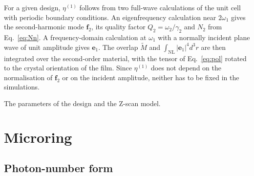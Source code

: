 \documentclass[9pt]{osa-supplemental-document}
\newcommand{\f}{\mathbf f}
\newcommand{\NL}{\mathrm{NL}}
\begin{document}
For a given design, $\eta^{(1)}$ follows from two full-wave calculations
of the unit cell with periodic boundary conditions.  An eigenfrequency
calculation near $2\omega_1$ gives the second-harmonic mode $\f_2$, its
quality factor $Q_2=\omega_2/\gamma_2$ and $N_2$ from Eq.~\eqref{eq:Nn}.  A
frequency-domain calculation at $\omega_1$ with a normally incident plane
wave of unit amplitude gives $\mathbf e_1$.  The overlap $\widetilde M$
and $\int_{\NL}|\mathbf e_1|^4d^3r$ are then integrated over the
second-order material, with the tensor of Eq.~\eqref{eq:pol} rotated to the
crystal orientation of the film.  Since $\eta^{(1)}$ does not depend on the
normalisation of $\f_2$ or on the incident amplitude, neither has to be
fixed in the simulations.

The parameters of the design and the Z-scan model.

\section{Microring}

\subsection{Photon-number form}
\end{document}
